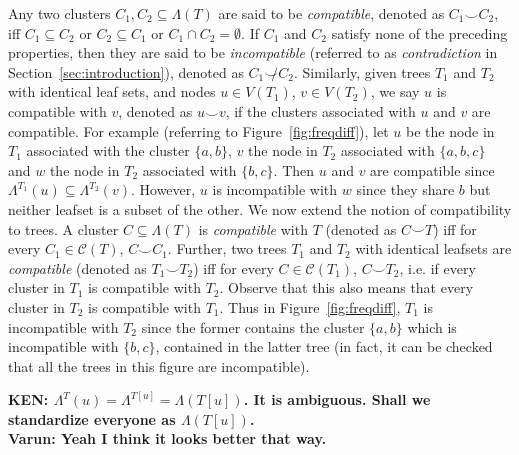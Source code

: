 \documentclass[final,1p,times]{elsarticle}
\newcommand{\compatible}{\smile}
\newcommand{\leafset}{\Lambda}
\begin{document}
    Any two clusters $C_1, C_2 \subseteq \leafset(T)$ are said to be \textit{compatible}, denoted as $C_1 \compatible C_2$, iff $C_1 \subseteq C_2$ or $C_2 \subseteq C_1$ or $C_1 \cap C_2 = \emptyset$. If $C_1$ and $C_2$ satisfy none of the preceding properties, then they are said to be \textit{incompatible} (referred to as \textit{contradiction} in Section~\ref{sec:introduction}), denoted as $C_1 \not\compatible C_2$. Similarly, given trees $T_1$ and $T_2$ with identical leaf sets, and nodes $u \in V(T_1)$, $v \in V(T_2)$, we say $u$ is compatible with $v$, denoted as $u \compatible v$, if the clusters associated with $u$ and $v$ are compatible. For example (referring to Figure~\ref{fig:freqdiff}), let $u$ be the node in $T_1$ associated with the cluster $\{a, b\}$, $v$ the node in $T_2$ associated with $\{a, b, c\}$ and $w$ the node in $T_2$ associated with $\{b, c\}$. Then $u$ and $v$ are compatible since $\leafset^{T_1}(u) \subseteq \leafset^{T_2}(v)$. However, $u$ is incompatible with $w$ since they share $b$ but neither leafset is a subset of the other. We now extend the notion of compatibility to trees. A cluster $C \subseteq \leafset(T)$ is \textit{compatible} with $T$ (denoted as $C \compatible T$) iff for every $C_1 \in \mathcal{C}(T)$, $C \compatible C_1$. Further, two trees $T_1$ and $T_2$ with identical leafsets are \textit{compatible} (denoted as $T_1 \compatible T_2$) iff for every $C \in \mathcal{C}(T_1)$, $C \compatible T_2$, i.e. if every cluster in $T_1$ is compatible with $T_2$. Observe that this also means that every cluster in $T_2$ is compatible with $T_1$. Thus in Figure~\ref{fig:freqdiff}, $T_1$ is incompatible with $T_2$ since the former contains the cluster $\{a, b\}$ which is incompatible with $\{b, c\}$, contained in the latter tree (in fact, it can be checked that all the trees in this figure are incompatible).

    {\bf KEN: $\leafset^T(u) = \leafset^{T[u]} = \leafset(T[u])$. It is ambiguous. Shall we standardize everyone as $\leafset(T[u])$.}\\
	{\bf Varun: Yeah I think it looks better that way.}
\end{document}
